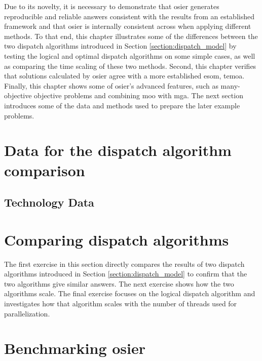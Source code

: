 Due to its novelty, it is necessary to demonstrate that \ac{osier} 
generates reproducible and reliable answers consistent with the results 
from an established framework and that \ac{osier} is internally consistent
across when applying different methods.
To that end, this chapter illustrates some of the
differences between the two dispatch algorithms introduced in Section
\ref{section:dispatch_model} by testing the logical and optimal dispatch algorithms  
on some simple cases, as well as comparing the time scaling of these two methods. 
Second, this chapter verifies that solutions
calculated by \ac{osier} agree with a more established \ac{esom}, \ac{temoa}.
Finally, this chapter shows some of \ac{osier}'s advanced features, such
as many-objective objective problems and combining \ac{moo} with \ac{mga}.
The next section introduces some of the data and methods used to prepare the 
later example problems.

\section{Data for the dispatch algorithm comparison}
\subsection{Technology Data}


\section{Comparing dispatch algorithms}
The first exercise in this section directly compares the results of two dispatch algorithms
introduced in Section \ref{section:dispatch_model} to confirm that the two algorithms
give similar answers. The next exercise shows how the two algorithms scale. The final exercise
focuses on the logical dispatch algorithm and investigates how that algorithm scales with the
number of threads used for parallelization.
% 

\section{Benchmarking \ac{osier}}




